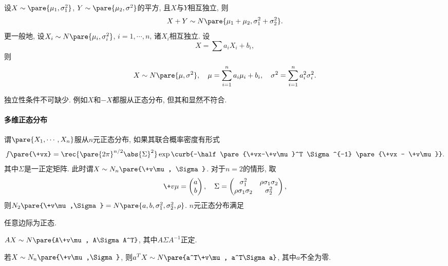 \documentclass{ctexart}
\begin{document}
\begin{sample}
    \begin{ex}
        设$X\sim\pare{\mu_1,\sigma_1^2}$, $Y\sim\pare{\mu_2,\sigma^2}$的平方, 且$X$与$Y$相互独立, 则
        \[ X+Y \sim N\pare{\mu_1+\mu_2, \sigma_1^2 + \sigma_2^2}. \]
        更一般地, 设$X_i\sim N\pare{\mu_i,\sigma_i^2}$, $i=1,\cdots,n$, 诸$X_i$相互独立. 设
        \[ X = \sum a_iX_i + b_i, \]
        则
        \[ X \sim N\pare{\mu,\sigma^2},\quad \mu = \sum_{i=1}^n a_i\mu_i + b_i,\quad \sigma^2 = \sum_{i=1}^n a_i^2 \sigma_i^2. \]
    \end{ex}
    \begin{remark}
        独立性条件不可缺少. 例如$X$和$-X$都服从正态分布, 但其和显然不符合.
    \end{remark}
\end{sample}

\paragraph{多维正态分布} %
\label{par:多维正态分布}

谓$\pare{X_1,\cdots,X_n}$服从$n$元正态分布, 如果其联合概率密度有形式
\[ f\pare{\+vx} = \rec{\pare{2\pi}^{n/2}\abs{\Sigma}^2}\exp\curb{-\half\pare{\+vx-\+v\mu}^T \Sigma^{-1} \pare{\+vx - \+v\mu}}. \]
其中$\Sigma$是一正定矩阵. 此时谓$X\sim N_n\pare{\+v\mu, \Sigma}$. 对于$n=2$的情形, 取
\[ \+v\mu = \begin{pmatrix}
    a\\
    b
\end{pmatrix},\quad \Sigma = \begin{pmatrix}
    \sigma_1^2 & \rho\sigma_1\sigma_2 \\
    \rho\sigma_1\sigma_2 & \sigma_2^2
\end{pmatrix}, \]
则$N_2\pare{\+v\mu,\Sigma} = N\pare{a,b,\sigma_1^2,\sigma_2^2,\rho}$. $n$元正态分布满足
\begin{cenum}
    \item 任意边际为正态.
    \item $AX \sim N\pare{A\+v\mu, A\Sigma A^T}$, 其中$A\Sigma A^{-1}$正定.
    \item 若$X\sim N_n\pare{\+v\mu,\Sigma}$, 则$a^T X\sim N\pare{a^T\+v\mu, a^T\Sigma a}$, 其中$a$不全为零.
\end{cenum}

\end{document}
